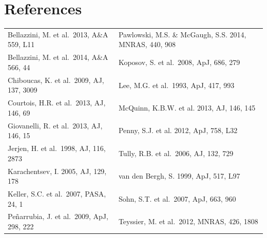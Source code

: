 \section*{References}

\begin{table}[h]
\begin{tabular}{ll}
Bellazzini, M. et al.\  2013, A\&A 559, L11 & Pawlowski, M.S. \&  McGaugh, S.S. 2014, MNRAS, 440, 908\\
Bellazzini, M. et al.\  2014, A\&A 566, 44 & Koposov, S. et al.\ 2008, ApJ, 686, 279\\
Chiboucas, K. et al.\  2009, AJ, 137, 3009 & Lee, M.G. et al.\ 1993, ApJ, 417, 993\\
Courtois, H.R. et al.\ 2013, AJ, 146, 69 &  McQuinn, K.B.W. et al. 2013, AJ, 146, 145\\
Giovanelli, R. et al.\ 2013, AJ, 146, 15 & Penny, S.J. et al. 2012, ApJ, 758, L32\\
Jerjen, H. et al.\ 1998, AJ, 116, 2873  &  Tully, R.B. et al.\ 2006, AJ, 132, 729\\
Karachentsev, I. 2005, AJ, 129, 178 &van den Bergh, S. 1999, ApJ, 517, L97\\
Keller, S.C. et al.\ 2007, PASA, 24, 1 & Sohn, S.T. et al.\ 2007, ApJ, 663, 960\\
{Pe{\~n}arrubia}, J. et al.\ 2009, ApJ, 298, 222 & Teyssier, M. et al.\ 2012, MNRAS, 426, 1808
\end{tabular}
\end{table}



